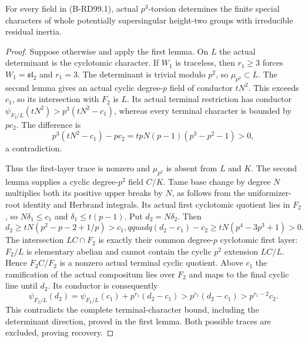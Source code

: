 \begin{theorem}
\label{thm:B-RD99-irreducible}
For every field in (B-RD99.1), actual $p^3$-torsion determines
the finite special characters of whole potentially supersingular
height-two groups with irreducible residual inertia.
\end{theorem}
\begin{proof}
Suppose otherwise and apply the first lemma. On $L$ the actual
determinant is the cyclotomic character. If $W_1$ is traceless,
then $r_1\ge3$ forces $W_1=\mathfrak{sl}_2$ and $r_1=3$.
The determinant is trivial modulo $p^2$, so $\mu_{p^2}\subset L$.
The second lemma gives an actual cyclic degree-$p$ field of
conductor $tN^2$. This exceeds $c_1$, so its intersection with
$F_2$ is $L$. Its actual terminal restriction has conductor
$\psi_{F_2/L}(tN^2)>p^3(tN^2-c_1)$, whereas every terminal
character is bounded by $pc_2$. The difference is
\[
 p^3(tN^2-c_1)-pc_2
                 =tpN(p-1)(p^3-p^2-1)>0,             \tag{B-RD99.15}
\]
a contradiction.

Thus the first-layer trace is nonzero and $\mu_{p^2}$ is
absent from $L$ and $K$. The second lemma supplies a cyclic
degree-$p^2$ field $C/K$. Tame base change by degree $N$
multiplies both its positive upper breaks by $N$, as follows
from the uniformizer-root identity and Herbrand integrals.
Its actual first cyclotomic quotient lies in $F_2$, so
$N\delta_1\le c_1$ and $\delta_1\le t(p-1)$.
Put $d_2=N\delta_2$. Then
\[
 d_2\ge tN(p^2-p-2+1/p)>c_1,qquad
 q(d_2-c_1)-c_2\ge tN(p^4-3p^3+1)>0.                \tag{B-RD99.16}
\]
The intersection $LC\cap F_2$ is exactly their common
degree-$p$ cyclotomic first layer: $F_2/L$ is elementary
abelian and cannot contain the cyclic $p^2$ extension $LC/L$.
Hence $F_2C/F_2$ is a nonzero actual terminal cyclic quotient.
Above $c_1$ the ramification of the actual compositum lies
over $F_2$ and maps to the final cyclic line until $d_2$.
Its conductor is consequently
\[
 \psi_{F_2/L}(d_2)
   =\psi_{F_2/L}(c_1)+p^{r_1}(d_2-c_1)
   >p^{r_1}(d_2-c_1)>p^{r_1-2}c_2.                 \tag{B-RD99.17}
\]
This contradicts the complete terminal-character bound,
including the determinant direction, proved in the first lemma.
Both possible traces are excluded, proving recovery.
\end{proof}

